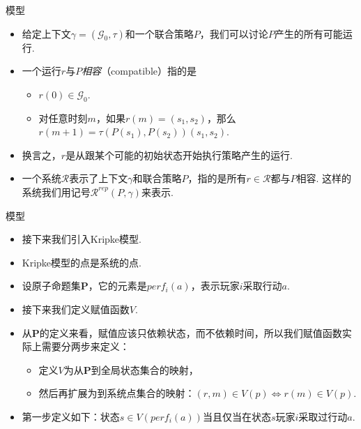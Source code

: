 \begin{frame}{模型}
\begin{itemize}
    \item 给定上下文$\gamma=(\mathcal G_0,\tau)$和一个联合策略$P$，我们可以讨论$P$产生的所有可能运行.
    \item 一个运行$r$与$P$\emph{相容}（compatible）指的是
    \begin{itemize}
        \item $r(0)\in\mathcal G_0$.
        \item 对任意时刻$m$，如果$r(m)=(s_1,s_2)$，那么$r(m+1)=\tau(P(s_1),P(s_2))(s_1,s_2)$.
    \end{itemize}
    \item 换言之，$r$是从跟某个可能的初始状态开始执行策略产生的运行.
    \item 一个系统$\mathcal R$表示了上下文$\gamma$和联合策略$P$，指的是所有$r\in\mathcal R$都与$P$相容. 这样的系统我们用记号$\mathcal R^{rep}(P,\gamma)$来表示.
\end{itemize}
\end{frame}



\begin{frame}{模型}
\begin{itemize}
    \item 接下来我们引入Kripke模型.
    \item Kripke模型的点是系统的点.
    \item 设原子命题集$\mathbf P$，它的元素是$perf_i(a)$，表示玩家$i$采取行动$a$.
    \item 接下来我们定义赋值函数$V$.
    \item 从$\mathbf P$的定义来看，赋值应该只依赖状态，而不依赖时间，所以我们赋值函数实际上需要分两步来定义：
    \begin{itemize}
        \item 定义$V$为从$\mathbf P$到全局状态集合的映射，
        \item 然后再扩展为到系统点集合的映射：$(r,m)\in V(p)\iff r(m)\in V(p)$.
    \end{itemize}
    \item 第一步定义如下：状态$s\in V(perf_i(a))$当且仅当在状态$s$玩家$i$采取过行动$a$.
\end{itemize}
\end{frame}

